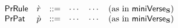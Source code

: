 \[\begin{array}{lllllll}
\mathsf{PrRule} & \grave{r} & ::= & \cdots & \cdots & \text{(as in $\mathsf{miniVerse}_\textbf{S}$)}\\
\mathsf{PrPat} & \grave{p} & ::= & \cdots & \cdots & \text{(as in $\mathsf{miniVerse}_\textbf{S}$)}\\
\end{array}\]

